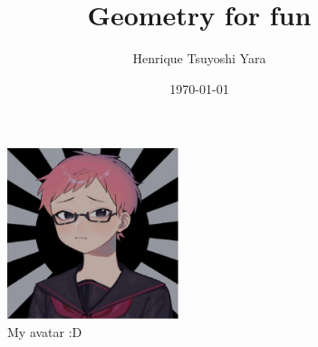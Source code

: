 \documentclass[10pt]{article}
\begin{document}
	\begin{titlepage}

        \title{Geometry for fun}
        \author{Henrique Tsuyoshi Yara}
        \date{\today}

        \null  %
        \nointerlineskip  %
        \vfill
        \let\snewpage \newpage
        \let\newpage \relax

        \maketitle

        \vspace{1in}
        \begin{figure}
            \centering
            \includegraphics[width=5cm]{my_avatar}
            \caption{My avatar :D}
        \end{figure}

        \thispagestyle{empty}
        \let \newpage \snewpage
        \vfill
        \break %

    \end{titlepage}

    \tableofcontents

    
\end{document}
